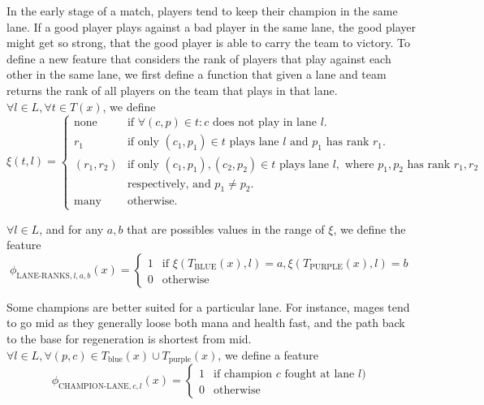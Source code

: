 In the early stage of a match, players tend to keep their champion in the same lane.
If a good player plays against a bad player in the same lane, the good player might get so strong, that the good player is able to carry the team to victory.
To define a new feature that considers the rank of players that play against each other in the same lane,
we first define a function that given a lane and team returns the rank of all players on the team that plays in that lane.
$\forall l \in L, \forall t \in T(x)$, we define
\begin{equation}\label{eq:xi}
  \xi(t,l) =
\begin{cases} 
  \text{none} & \text{if } \forall(c, p) \in t: c \text{ does not play in lane } l. \\
  r_1 & \text{if only } (c_1, p_1) \in t \text{ plays lane } l \text{ and } p_1 \text{ has rank } r_1 \text{.}\\
  (r_1, r_2) & \text{if only } (c_1, p_1), (c_2, p_2) \in t \text{ plays lane } l, \text{ where } p_1, p_2 \text{ has rank } r_1, r_2\\ 
&\text{respectively, and } p_1 \neq p_2.\\
  \text{many} & \text{otherwise}.
\end{cases}
\end{equation}

$\forall l \in L$, and for any $a,b$ that are possibles values in the range of $\xi$, we define the feature
\begin{equation}\label{eq:laneranks}
\phi_{\text{LANE-RANKS},l,a,b}(x) =
\begin{cases} 
  1 & \text{if } \xi(T_\text{BLUE}(x),l) = a, \xi(T_\text{PURPLE}(x),l) = b\\
  0 & \text{otherwise} 
\end{cases}  
\end{equation}

Some champions are better suited for a particular lane. For instance, mages tend to go mid as they generally loose both mana and health fast, and the path back to the base for regeneration is shortest from mid.
$\forall l \in L, \forall(p, c) \in T_\text{blue}(x) \cup T_\text{purple}(x)$, we define a feature
\begin{equation}\label{eq:championlane}
  \phi_{\text{CHAMPION-LANE},c,l}(x) =
\begin{cases} 
  1 & \text{if champion } c \text{ fought at lane } l)\\
  0 & \text{otherwise} 
\end{cases}
\end{equation}

